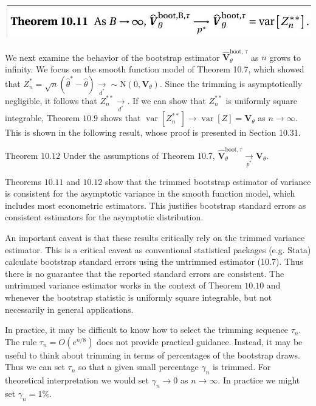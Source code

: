\documentclass[10pt]{article}
\begin{document}
\includegraphics[max width=\textwidth]{2022_09_17_704b7bd5000562ad7735g-20}

We next examine the behavior of the bootstrap estimator $\widehat{\boldsymbol{V}}_{\theta}^{\text {boot, } \tau}$ as $n$ grows to infinity. We focus on the smooth function model of Theorem 10.7, which showed that $Z_{n}^{*}=\sqrt{n}\left(\widehat{\theta}^{*}-\widehat{\theta}\right) \underset{d^{*}}{\longrightarrow} \sim \mathrm{N}\left(0, \boldsymbol{V}_{\theta}\right)$. Since the trimming is asymptotically negligible, it follows that $Z_{n}^{* *} \underset{d^{*}}{\longrightarrow}$. If we can show that $Z_{n}^{* *}$ is uniformly square integrable, Theorem $10.9$ shows that $\operatorname{var}\left[Z_{n}^{* *}\right] \rightarrow \operatorname{var}[Z]=\boldsymbol{V}_{\theta}$ as $n \rightarrow \infty$. This is shown in the following result, whose proof is presented in Section 10.31.

Theorem $10.12$ Under the assumptions of Theorem 10.7, $\widehat{\boldsymbol{V}}_{\theta}^{\mathrm{boot}, \tau} \underset{p^{*}}{\longrightarrow} \boldsymbol{V}_{\theta} .$

Theorems $10.11$ and $10.12$ show that the trimmed bootstrap estimator of variance is consistent for the asymptotic variance in the smooth function model, which includes most econometric estimators. This justifies bootstrap standard errors as consistent estimators for the asymptotic distribution.

An important caveat is that these results critically rely on the trimmed variance estimator. This is a critical caveat as conventional statistical packages (e.g. Stata) calculate bootstrap standard errors using the untrimmed estimator (10.7). Thus there is no guarantee that the reported standard errors are consistent. The untrimmed variance estimator works in the context of Theorem $10.10$ and whenever the bootstrap statistic is uniformly square integrable, but not necessarily in general applications.

In practice, it may be difficult to know how to select the trimming sequence $\tau_{n}$. The rule $\tau_{n}=O\left(e^{n / 8}\right)$ does not provide practical guidance. Instead, it may be useful to think about trimming in terms of percentages of the bootstrap draws. Thus we can set $\tau_{n}$ so that a given small percentage $\gamma_{n}$ is trimmed. For theoretical interpretation we would set $\gamma_{n} \rightarrow 0$ as $n \rightarrow \infty$. In practice we might set $\gamma_{n}=1 \%$.
\end{document}
